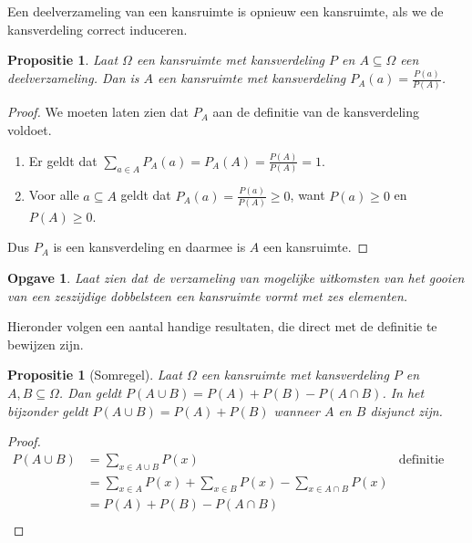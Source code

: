 \documentclass[a4paper]{book}
\newtheorem{proposition}[theorem]{Propositie}
\newtheorem{exercise}[theorem]{Opgave}
\theoremstyle{definition}
\begin{document}
Een deelverzameling van een kansruimte is opnieuw een kansruimte, als we de kansverdeling correct induceren.
\begin{proposition}
    Laat $\Omega$ een kansruimte met kansverdeling $P$ en $A \subseteq \Omega$ een deelverzameling.
    Dan is $A$ een kansruimte met kansverdeling $P_A(a) = \frac{P(a)}{P(A)}$.
\end{proposition}
\begin{proof}
    We moeten laten zien dat $P_A$ aan de definitie van de kansverdeling voldoet.
    \begin{enumerate}[i]
        \item Er geldt dat $\sum_{a \in A}P_A(a) = P_A(A) = \frac{P(A)}{P(A)} = 1$.
        \item Voor alle $a \subseteq A$ geldt dat $P_A(a) = \frac{P(a)}{P(A)} \geq 0$, want $P(a) \geq 0$ en $P(A) \geq 0$.
    \end{enumerate}
    Dus $P_A$ is een kansverdeling en daarmee is $A$ een kansruimte.
\end{proof}

\begin{exercise}
    Laat zien dat de verzameling van mogelijke uitkomsten van het gooien van een zeszijdige dobbelsteen een kansruimte vormt met zes elementen.
\end{exercise}

Hieronder volgen een aantal handige resultaten, die direct met de definitie te bewijzen zijn.
\begin{proposition}[Somregel]\label{somregel}
    Laat $\Omega$ een kansruimte met kansverdeling $P$ en $A,B \subseteq \Omega$.
    Dan geldt $P(A \cup B) = P(A) + P(B) - P(A \cap B)$.
    In het bijzonder geldt $P(A \cup B) = P(A) + P(B)$ wanneer $A$ en $B$ disjunct zijn.
\end{proposition}
\begin{proof}
    \begin{align*}
        P(A \cup B)     &= \sum_{x \in A \cup B} P(x) & \text{definitie kansverdeling}\\
                        &= \sum_{x \in A} P(x) + \sum_{x \in B} P(x) - \sum_{x \in A \cap B} P(x) \\
                        &= P(A) + P(B) - P(A \cap B) \\
    \end{align*}
\end{proof}
\end{document}
